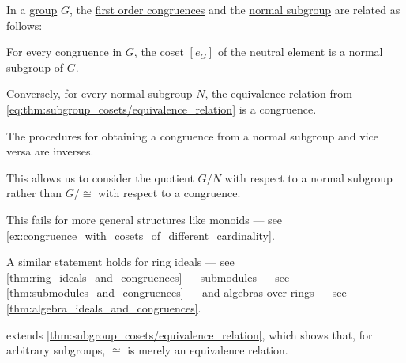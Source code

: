 \begin{proposition}\label{thm:normal_subgroups_and_congruences}
  In a \hyperref[def:group]{group} \( G \), the \hyperref[def:fol_congruence]{first order congruences} and the \hyperref[def:normal_subgroup]{normal subgroup} are related as follows:
  \begin{thmenum}
     For every congruence in \( G \), the coset \( [e_G] \) of the neutral element is a normal subgroup of \( G \).

     Conversely, for every normal subgroup \( N \), the equivalence relation from \eqref{eq:thm:subgroup_cosets/equivalence_relation} is a congruence.

     The procedures for obtaining a congruence from a normal subgroup and vice versa are inverses.
  \end{thmenum}
\end{proposition}
\begin{comments}
  \item This allows us to consider the quotient \( G / N \) with respect to a normal subgroup rather than \( G / {\cong} \) with respect to a congruence.

  \item This fails for more general structures like monoids --- see \cref{ex:congruence_with_cosets_of_different_cardinality}.

  \item A similar statement holds for ring ideals --- see \cref{thm:ring_ideals_and_congruences} --- submodules --- see \cref{thm:submodules_and_congruences} --- and algebras over rings --- see \cref{thm:algebra_ideals_and_congruences}.

  \item {} extends \cref{thm:subgroup_cosets/equivalence_relation}, which shows that, for arbitrary subgroups, \( {\cong} \) is merely an equivalence relation.
\end{comments}
